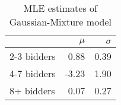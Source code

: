 \begin{table}
\centering
\caption{MLE estimates of Gaussian-Mixture model}
\label{tab:mleParam}
\begin{tabular}{lrr}
\toprule
{} & $\mu$ & $\sigma$ \\
\midrule
2-3 bidders &  0.88 &     0.39 \\
4-7 bidders & -3.23 &     1.90 \\
8+ bidders  &  0.07 &     0.27 \\
\bottomrule
\end{tabular}
\end{table}

